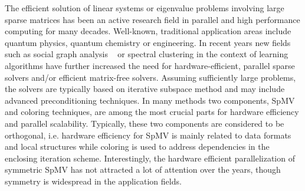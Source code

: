The efficient solution of linear systems or eigenvalue problems involving large sparse matrices has been an active research field in parallel and high performance computing for many decades. Well-known, traditional application areas include quantum physics, quantum chemistry or engineering. In recent years new fields such as social graph analysis ~\cite{Simpson:2018:BGP:3218176.3218232}
or spectral clustering in the context of learning algorithms \cite{vonLuxburg2007,JMLR:v17:16-109} have further increased the need for hardware-efficient, parallel sparse solvers and/or efficient matrix-free solvers. Assuming sufficiently large problems, the solvers are typically based on iterative subspace method and may include advanced preconditioning techniques. In many methods two components,  \acrfull{SpMV}  and coloring techniques, are among the most crucial parts for hardware efficiency and parallel scalability. Typically, these two components are considered to be orthogonal, i.e. hardware efficiency for \Acrshort{SpMV} is mainly related to data formats and local structures while coloring is used to address dependencies in the enclosing iteration scheme.  Interestingly, the hardware efficient parallelization of symmetric \Acrshort{SpMV} has not attracted a lot of attention over the years, though symmetry is widespread in the application fields. 

